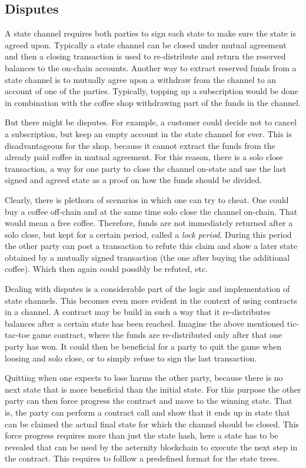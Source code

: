 \subsection{Disputes}

A state channel requires both parties to sign each state to make
sure the state is agreed upon. Typically a state channel can be closed
under mutual agreement and then a closing transaction is used to
re-distribute and return the reserved balances to the on-chain
accounts. Another way to extract reserved funds from a state channel
is to mutually agree upon a withdraw from the channel to an account of
one of the parties. Typically, topping up a subscription would be done
in combination with the coffee shop withdrawing part of the funds in
the channel.

But there might be disputes. For example, a customer
could decide not to cancel a subscription, but keep an empty account
in the state channel for ever. This is disadvantageous for the shop,
because it cannot extract the funds from the already paid coffee in
mutual agreement. For this reason, there is a solo close transaction,
a way for one party to close the channel on-state and use the last
signed and agreed state as a proof on how the funds should be divided.

Clearly, there is plethora of scenarios in which one can try to
cheat. One could buy a coffee off-chain and at the same time solo
close the channel on-chain. That would mean a free coffee. Therefore,
funds are not immediately returned after a solo close, but kept for a
certain period, called a \textit{lock period}. During this period the
other party can post a transaction to refute this claim and show a
later state obtained by a mutually signed transaction (the one after
buying the additional coffee). Which then again could possibly be
refuted, etc.

Dealing with disputes is a considerable part of the logic and
implementation of state channels. This becomes even more evident in
the context of using contracts in a channel. A contract may be build
in such a way that it re-distributes balances after a certain state has
been reached. Imagine the above mentioned tic-tac-toe game contract,
where the funds are re-distributed only after that one party has
won. It could then be beneficial for a party to quit the
game when loosing and solo close, or to simply refuse to sign the last
transaction.

Quitting when one expects to lose
harms the other party, because there is no next state that is more
beneficial than the initial state. For this purpose the other party
can then force progress the contract and move to the winning
state. That is, the party can perform a contract call and show that it
ends up in state that can be claimed the actual final state for which
the channel should be closed. This force progress requires more than
just the state hash, here a state has to be revealed that can be used
by the aeternity blockchain to execute the next step in the
contract. This requires to folllow a predefined format for the state trees.


